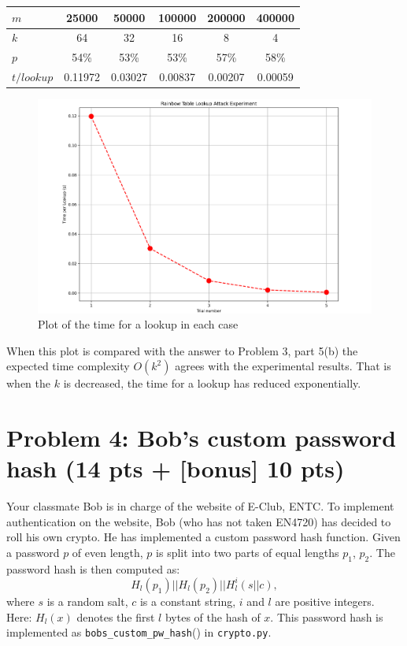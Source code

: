 \documentclass[11pt,letterpaper]{article}
\newenvironment{answer}{\em \color{blue} \begin{adjustwidth}{1cm}{1cm}}{\end{adjustwidth}}
\begin{document}
\begin{enumerate}
		\begin{answer}
			
			\begin{center}
				\begin{tabular}{|l|c|c|c|c|c|}
					\hline
					$m$ & 25000 & 50000 & 100000 & 200000 & 400000 \\ \hline
					$k$ & 64 & 32    & 16      & 8      & 4      \\ \hline \hline
					$p$ & 54\% & 53\%  &  53\%  & 57\%  &  58\%   \\ \hline
					$t/lookup$ &  0.11972 & 0.03027 &0.00837 & 0.00207& 0.00059\\ \hline
				\end{tabular}	
			\end{center}
		
		\begin{figure}[H]
			\centering
			\includegraphics[width=0.6\columnwidth]{images/p3/plot.png}
			\caption{Plot of the time for a lookup in each case}
		\end{figure}
			
		 When this plot is compared with the  answer to Problem 3, part 5(b) the expected time complexity   $O(k^2)$ agrees with the experimental results. That is when the $k$ is decreased, the time for a lookup has reduced exponentially. 
			
		\end{answer}
		
	\end{enumerate}
	
	\newpage
	
	\section*{Problem 4: Bob's custom password hash (14 pts + [bonus] 10 pts)}
	
	Your classmate Bob is in charge of the website of E-Club, ENTC. To implement authentication on the website, Bob (who has not taken EN4720) has decided to roll his own crypto. He has implemented a custom password hash function. Given a password $p$ of even length, $p$ is split into two parts of equal lengths $p_1$, $p_2$. The password hash is then computed as:
	\[ H_l(p_1) || H_l(p_2) || H_l^i(s || c) , \]
	where $s$ is a random salt, $c$ is a constant string, $i$ and $l$ are positive integers. Here: $H_l(x)$ denotes the first $l$ bytes of the hash of $x$. This password hash is implemented as \texttt{bobs\_custom\_pw\_hash}() in \texttt{crypto.py}.
	
\end{document}
